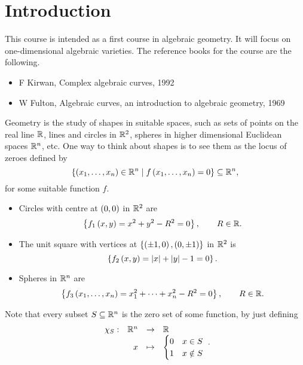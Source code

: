 \def\module{M3P20 Geometry I: Algebraic Curves}
\def\lecturer{Dr Mattia Talpo}
\def\term{Autumn 2018}

\def\thm{section}







\setcounter{section}{0}

\section{Introduction}


This course is intended as a first course in algebraic geometry. It will focus on one-dimensional algebraic varieties. The reference books for the course are the following.
\begin{itemize}
\item F Kirwan, Complex algebraic curves, 1992
\item W Fulton, Algebraic curves, an introduction to algebraic geometry, 1969
\end{itemize}
Geometry is the study of shapes in suitable spaces, such as sets of points on the real line $ \mathbb{R} $, lines and circles in $ \mathbb{R}^2 $, spheres in higher dimensional Euclidean spaces $ \mathbb{R}^n $, etc. One way to think about shapes is to see them as the locus of zeroes defined by
$$ \left\{ \left( x_1, \dots, x_n \right) \in \mathbb{R}^n \mid f\left( x_1, \dots, x_n \right) = 0 \right\} \subseteq \mathbb{R}^n, $$
for some suitable function $ f $.

\begin{example}
\label{eg:1.1}
\hfill
\begin{itemize}
\item Circles with centre at $ \left( 0, 0 \right) $ in $ \mathbb{R}^2 $ are
$$ \left\{ f_1\left( x, y \right) = x^2 + y^2 - R^2 = 0 \right\}, \qquad R \in \mathbb{R}. $$
\item The unit square with vertices at $ \left\{ \left( \pm 1, 0 \right), \left( 0, \pm 1 \right) \right\} $ in $ \mathbb{R}^2 $ is
$$ \left\{ f_2\left( x, y \right) = \left\lvert x \right\rvert + \left\lvert y \right\rvert - 1 = 0 \right\}. $$
\item Spheres in $ \mathbb{R}^n $ are
$$ \left\{ f_3\left( x_1, \dots, x_n \right) = x_1^2 + \dots + x_n^2 - R^2 = 0 \right\}, \qquad R \in \mathbb{R}. $$
\end{itemize}
\end{example}

\begin{remark}
Note that every subset $ S \subseteq \mathbb{R}^n $ is the zero set of some function, by just defining
$$ \function[\chi_S]{\R^n}{\R}{x}{
\begin{cases}
0 & x \in S \\
1 & x \notin S
\end{cases}
}. $$
\end{remark}

